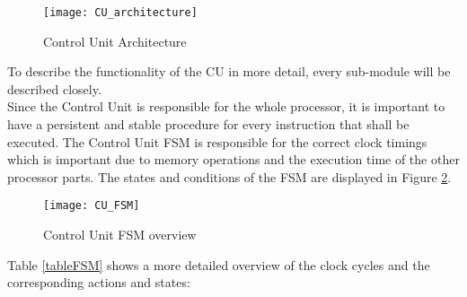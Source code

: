 \begin{figure}[H]
	\centering
	\texttt{[image: CU\_architecture]}
	\caption{Control Unit Architecture}
	\label{fig:cuarchitecture}
\end{figure}

To describe the functionality of the CU in more detail, every sub-module will be described closely.\\
Since the Control Unit is responsible for the whole processor, it is important to have a persistent and stable procedure for every instruction that shall be executed. The Control Unit \ac{FSM} is responsible for the correct clock timings which is important due to memory operations and the execution time of the other processor parts. The states and conditions of the FSM are displayed in Figure \ref{fig:cufsm}. 

\begin{figure}[H]
	\centering
	\texttt{[image: CU\_FSM]}
	\caption{Control Unit FSM overview}
	\label{fig:cufsm}
\end{figure}

Table \ref{tableFSM} shows a more detailed overview of the clock cycles and the corresponding actions and states:\\

\begin{table}[h]
\caption{Timing of FSM}
\label{tableFSM}
\end{table}

